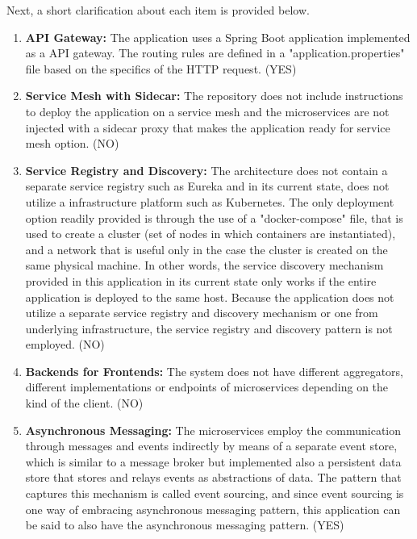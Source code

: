 \documentclass{Configuration_Files/PoliMi3i_thesis}
\begin{document}
Next, a short clarification about each item is provided below.

\begin{enumerate}
    \item \textbf{API Gateway:} The application uses a Spring Boot application implemented as a API gateway.
    The routing rules are defined in a "application.properties" file based on the specifics of the HTTP request. (YES)
    
    \item \textbf{Service Mesh with Sidecar:} The repository does not include instructions to deploy the application on a service mesh and the microservices are not injected with a sidecar proxy that makes the application ready for service mesh option. (NO)
    
    \item \textbf{Service Registry and Discovery:} The architecture does not contain a separate service registry such as Eureka and in its current state, does not utilize a infrastructure platform such as Kubernetes.
    The only deployment option readily provided is through the use of a "docker-compose" file, that is used to create a cluster (set of nodes in which containers are instantiated), and a network that is useful only in the case the cluster is created on the same physical machine.
    In other words, the service discovery mechanism provided in this application in its current state only works if the entire application is deployed to the same host.
    Because the application does not utilize a separate service registry and discovery mechanism or one from underlying infrastructure, the service registry and discovery pattern is not employed. (NO)
    
    \item \textbf{Backends for Frontends:} The system does not have different aggregators, different implementations or endpoints of microservices depending on the kind of the client. (NO)
    
    \item \textbf{Asynchronous Messaging:} The microservices employ the communication through messages and events indirectly by means of a separate event store, which is similar to a message broker but implemented also a persistent data store that stores and relays events as abstractions of data.
    The pattern that captures this mechanism is called event sourcing, and since event sourcing is one way of embracing asynchronous messaging pattern, this application can be said to also have the asynchronous messaging pattern. (YES)
    

\end{enumerate}
\end{document}
